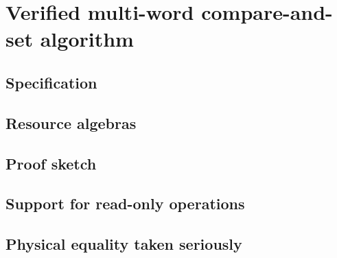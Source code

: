 \section{Verified multi-word compare-and-set algorithm}






\subsection{Specification}


\subsection{Resource algebras}

\subsection{Proof sketch}


\subsection{Support for read-only operations}


\subsection{Physical equality taken seriously}

